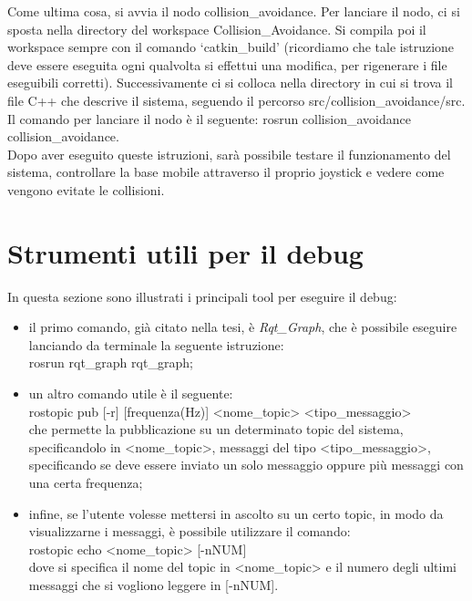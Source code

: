 Come ultima cosa, si avvia il nodo collision\_avoidance. Per lanciare il nodo, ci si sposta nella directory del workspace Collision\_Avoidance. Si compila poi il workspace sempre con il comando ‘catkin\_build’ (ricordiamo che tale istruzione deve essere eseguita ogni qualvolta si effettui una modifica, per rigenerare i file eseguibili corretti). Successivamente ci si colloca nella directory in cui si trova il file C++ che descrive il sistema, seguendo il percorso src/collision\_avoidance/src.\\
Il comando per lanciare il nodo è il seguente: rosrun collision\_avoidance collision\_avoidance.\\
Dopo aver eseguito queste istruzioni, sarà possibile testare il funzionamento del sistema, controllare la base mobile attraverso il proprio joystick e vedere come vengono evitate le collisioni.\\

\section{Strumenti utili per il debug}
In questa sezione sono illustrati i principali tool per eseguire il debug:
\begin{itemize}
	\item il primo comando, già citato nella tesi, è \textit{Rqt\_Graph}, che è possibile eseguire lanciando da terminale la seguente istruzione:\\
	rosrun rqt\_graph rqt\_graph;
	\item un altro comando utile è il seguente:\\
	rostopic pub [-r] [frequenza(Hz)] <nome\_topic> <tipo\_messaggio>\\
	che permette la pubblicazione su un determinato topic del sistema, specificandolo in <nome\_topic>, messaggi del tipo <tipo\_messaggio>, specificando se deve essere inviato un solo messaggio oppure più messaggi con una certa frequenza;
	\item infine, se l'utente volesse mettersi in ascolto su un certo topic, in modo da visualizzarne i messaggi, è possibile utilizzare il comando:\\
	rostopic echo <nome\_topic> [-nNUM]\\
	dove si specifica il nome del topic in <nome\_topic> e il numero degli ultimi messaggi che si vogliono leggere in [-nNUM].
\end{itemize}


